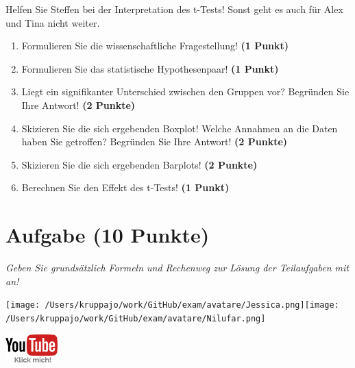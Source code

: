 \documentclass[a4paper, 9pt]{scrartcl}\usepackage[]{graphicx}\usepackage[]{xcolor}
\begin{document}
Helfen Sie Steffen bei der Interpretation des t-Tests! Sonst geht es auch für Alex und Tina nicht weiter.
  
\begin{enumerate}
  \item Formulieren Sie die wissenschaftliche Fragestellung! \textbf{(1 Punkt)}
  \item Formulieren Sie das statistische Hypothesenpaar! \textbf{(1 Punkt)}
\item Liegt ein signifikanter Unterschied zwischen den Gruppen vor? Begründen Sie Ihre Antwort! \textbf{(2 Punkte)}
\item Skizieren Sie die sich ergebenden Boxplot! Welche Annahmen an die Daten haben Sie getroffen? Begründen Sie Ihre
  Antwort! \textbf{(2 Punkte)} 
\item Skizieren Sie die sich ergebenden Barplots! \textbf{(2 Punkte)}
\item Berechnen Sie den Effekt des t-Tests! \textbf{(1 Punkt)}
\end{enumerate}
 
\clearpage

\section{Aufgabe \hfill (10 Punkte)}

\textit{Geben Sie grundsätzlich Formeln und Rechenweg zur Lösung der Teilaufgaben mit an!} \\[1Ex]
 

 
\begin{minipage}[t]{0.5\textwidth}
\texttt{[image: /Users/kruppajo/work/GitHub/exam/avatare/Jessica.png]}\hspace{-4mm}\texttt{[image: /Users/kruppajo/work/GitHub/exam/avatare/Nilufar.png]}
\end{minipage}
\begin{minipage}[t]{0.5\textwidth}
\hfill
\href{https://youtu.be/kHmfEmU6lrk}{\includegraphics[width = 2cm]{img/youtube}}
\end{minipage}
\end{document}
